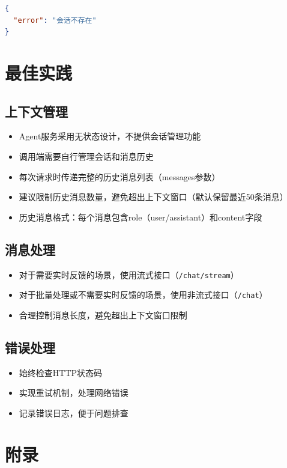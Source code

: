 \documentclass[12pt,a4paper]{article}
\begin{document}
\begin{lstlisting}[language=json]
{
  "error": "会话不存在"
}
\end{lstlisting}

\section{最佳实践}

\subsection{上下文管理}

\begin{itemize}
  \item Agent服务采用无状态设计，不提供会话管理功能
  \item 调用端需要自行管理会话和消息历史
  \item 每次请求时传递完整的历史消息列表（messages参数）
  \item 建议限制历史消息数量，避免超出上下文窗口（默认保留最近50条消息）
  \item 历史消息格式：每个消息包含role（user/assistant）和content字段
\end{itemize}

\subsection{消息处理}

\begin{itemize}
  \item 对于需要实时反馈的场景，使用流式接口（\texttt{/chat/stream}）
  \item 对于批量处理或不需要实时反馈的场景，使用非流式接口（\texttt{/chat}）
  \item 合理控制消息长度，避免超出上下文窗口限制
\end{itemize}

\subsection{错误处理}

\begin{itemize}
  \item 始终检查HTTP状态码
  \item 实现重试机制，处理网络错误
  \item 记录错误日志，便于问题排查
\end{itemize}

\section{附录}
\end{document}
